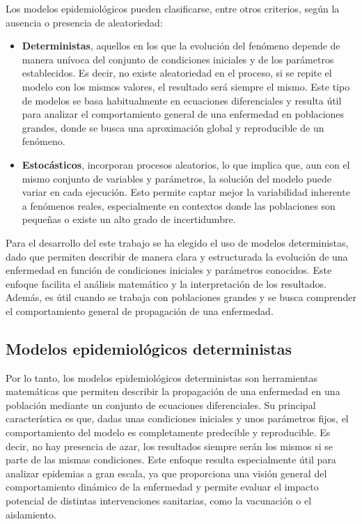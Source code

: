 Los modelos epidemiológicos pueden clasificarse, entre otros criterios, según la ausencia o presencia de aleatoriedad:
\begin{itemize}
    \item \textbf{Deterministas}, aquellos en los que la evolución del fenómeno depende de manera unívoca del conjunto de condiciones iniciales y de los parámetros establecidos. Es decir, no existe aleatoriedad en el proceso, si se repite el modelo con los mismos valores, el resultado será siempre el mismo. Este tipo de modelos se basa habitualmente en ecuaciones diferenciales y resulta útil para analizar el comportamiento general de una enfermedad en poblaciones grandes, donde se busca una aproximación global y reproducible de un fenómeno.
    \item \textbf{Estocásticos}, incorporan procesos aleatorios, lo que implica que, aun con el mismo conjunto de variables y parámetros, la solución del modelo puede variar en cada ejecución. Esto permite captar mejor la variabilidad inherente a fenómenos reales, especialmente en contextos donde las poblaciones son pequeñas o existe un alto grado de incertidumbre.
\end{itemize}
	
Para el desarrollo del este trabajo se ha elegido el uso de modelos deterministas, dado que permiten describir de manera clara y estructurada la evolución de una enfermedad en función de condiciones iniciales y parámetros conocidos. Este enfoque facilita el análisis matemático y la interpretación de los resultados. Además, es útil cuando se trabaja con poblaciones grandes y se busca comprender el comportamiento general de propagación de una enfermedad.

\subsection{Modelos epidemiológicos deterministas}
Por lo tanto, los modelos epidemiológicos deterministas son herramientas matemáticas que permiten describir la propagación de una enfermedad en una población mediante un conjunto de ecuaciones diferenciales. Su principal característica es que, dadas unas condiciones iniciales y unos parámetros fijos, el comportamiento del modelo es completamente predecible y reproducible. Es decir, no hay presencia de azar, los resultados siempre serán los mismos si se parte de las mismas condiciones. Este enfoque resulta especialmente útil para analizar epidemias a gran escala, ya que proporciona una visión general del comportamiento dinámico de la enfermedad y permite evaluar el impacto potencial de distintas intervenciones sanitarias, como la vacunación o el aislamiento.

